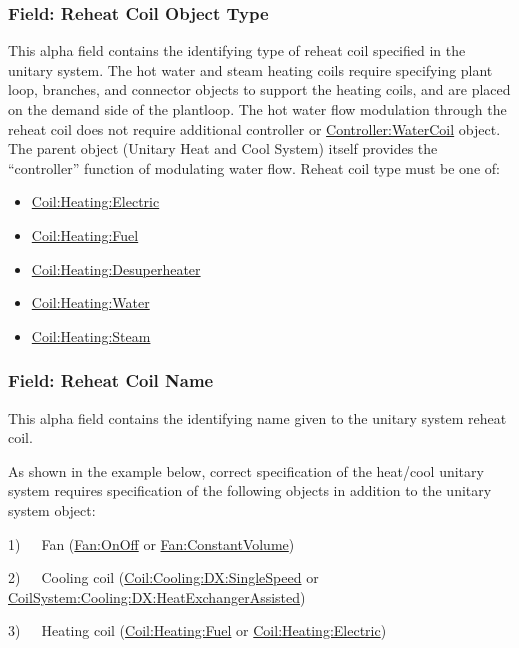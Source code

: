 \subsubsection{Field: Reheat Coil Object Type}\label{field-reheat-coil-object-type-1-000}

This alpha field contains the identifying type of reheat coil specified in the unitary system. The hot water and steam heating coils require specifying plant loop, branches, and connector objects to support the heating coils, and are placed on the demand side of the plantloop. The hot water flow modulation through the reheat coil does not require additional controller or \hyperref[controllerwatercoil]{Controller:WaterCoil} object. The parent object (Unitary Heat and Cool System) itself provides the ``controller'' function of modulating water flow. Reheat coil type must be one of:

\begin{itemize}
\item
  \hyperref[coilheatingelectric]{Coil:Heating:Electric}
\item
  \hyperref[coilheatinggas-000]{Coil:Heating:Fuel}
\item
  \hyperref[coilheatingdesuperheater]{Coil:Heating:Desuperheater}
\item
  \hyperref[coilheatingwater]{Coil:Heating:Water}
\item
  \hyperref[coilheatingsteam]{Coil:Heating:Steam}
\end{itemize}

\subsubsection{Field: Reheat Coil Name}\label{field-reheat-coil-name-1-000}

This alpha field contains the identifying name given to the unitary system reheat coil.

As shown in the example below, correct specification of the heat/cool unitary system requires specification of the following objects in addition to the unitary system object:

1)~~~Fan (\hyperref[fanonoff]{Fan:OnOff} or \hyperref[fanconstantvolume]{Fan:ConstantVolume})

2)~~~Cooling coil (\hyperref[coilcoolingdxsinglespeed]{Coil:Cooling:DX:SingleSpeed} or \hyperref[coilsystemcoolingdxheatexchangerassisted]{CoilSystem:Cooling:DX:HeatExchangerAssisted})

3)~~~Heating coil (\hyperref[coilheatinggas-000]{Coil:Heating:Fuel} or \hyperref[coilheatingelectric]{Coil:Heating:Electric})

